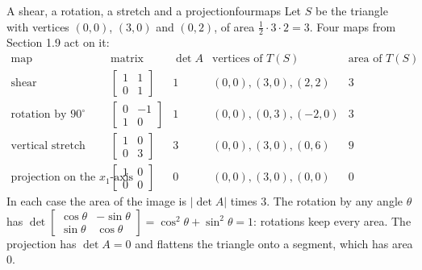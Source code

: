 \documentclass[11pt]{article}
\begin{document}
\begin{exmp}{A shear, a rotation, a stretch and a projection}{fourmaps}
Let $S$ be the triangle with vertices $(0,0)$, $(3,0)$ and $(0,2)$, of area $\tfrac12\cdot3\cdot2=3$. Four maps from Section 1.9 act on it:
\[
\begin{array}{l|c|r|c|l}
\text{map}&\text{matrix}&\det A&\text{vertices of }T(S)&\text{area of }T(S)\\\hline
\text{shear}&\begin{bmatrix}1&1\\0&1\end{bmatrix}&1&(0,0),(3,0),(2,2)&3\\[8pt]
\text{rotation by }90^\circ&\begin{bmatrix}0&-1\\1&0\end{bmatrix}&1&(0,0),(0,3),(-2,0)&3\\[8pt]
\text{vertical stretch}&\begin{bmatrix}1&0\\0&3\end{bmatrix}&3&(0,0),(3,0),(0,6)&9\\[8pt]
\text{projection on the }x_1\text{-axis}&\begin{bmatrix}1&0\\0&0\end{bmatrix}&0&(0,0),(3,0),(0,0)&0
\end{array}
\]
In each case the area of the image is $|\det A|$ times $3$. The rotation by any angle $\theta$ has $\det\begin{bmatrix}\cos\theta&-\sin\theta\\\sin\theta&\cos\theta\end{bmatrix}=\cos^2\theta+\sin^2\theta=1$: rotations keep every area. The projection has $\det A=0$ and flattens the triangle onto a segment, which has area $0$.
\end{exmp}
\end{document}
